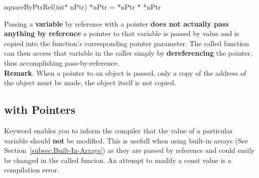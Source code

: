 \begin{itemize}
\begin{minipage}{\MPWxXSxLISTING\textwidth}
\begin{CPPCode}
squareByPtrRef(int* nPtr)
{
    *nPtr = *nPtr * *nPtr
}
    \end{CPPCode}
    \end{minipage}
\end{itemize}

\noindent Passing a \textbf{variable} by reference with a pointer \textbf{does not actually pass anything by reference} a pointer to that variable is passed by value and is copied into the function’s corresponding pointer parameter. The called function can then access that variable in the caller simply by \textbf{dereferencing} the pointer, thus accomplishing pass-by-reference.\\

\noindent \textbf{Remark}. When a pointer to an object is passed, only a copy of the address of the object must be made, the object itself is not copied.

\subsection{ with Pointers}
\label{subsec:Pointers-02-ImportantConcepts-02-const-with-Pointers}


Keyword  enables you to inform the compiler that the value of a particular variable should \textbf{not} be modified. This is usefull when using built-in arrays (See Section~\cref{subsec:Built-In-Arrays}) as they are passed by reference and could easily be changed in the called funcion. An attempt to modify a const value is a compilation error.

